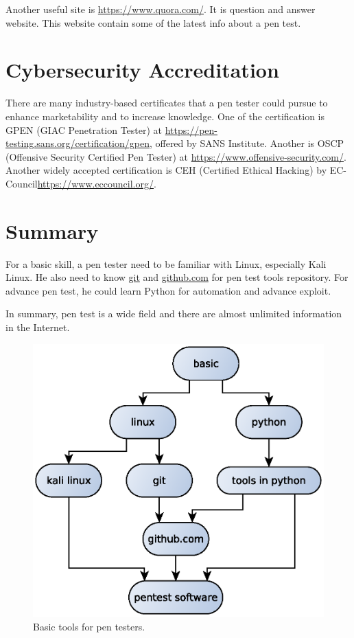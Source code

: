 \documentclass[7x9]{times}
\begin{document}
Another useful site is \url{https://www.quora.com/}. It is
question and answer website. This website contain some of
the latest info about a pen test.



\section{Cybersecurity Accreditation}

There are many industry-based certificates that a pen tester
could pursue to enhance marketability and to increase
knowledge. One of the certification is GPEN (GIAC
Penetration Tester) at
\url{https://pen-testing.sans.org/certification/gpen},
offered by SANS Institute. Another is OSCP (Offensive
Security Certified Pen Tester) at
\url{https://www.offensive-security.com/}.  Another widely
accepted certification is CEH (Certified Ethical Hacking) by
EC-Council\url{https://www.eccouncil.org/}.

 
\section{Summary}

For a basic skill, a pen tester need to be familiar with
Linux, especially Kali Linux. He also need to know \url{git}
and \url{github.com} for pen test tools repository. For
advance pen test, he could learn Python for automation and
advance exploit.

In summary, pen test is a wide field and there are almost unlimited information
in the Internet. 
\begin{center}
	\begin{figure}[ht]
		\includegraphics[scale=.75]{tools}
		\caption{Basic tools for pen testers.}
	\end{figure}
\end{center}
\end{document}
